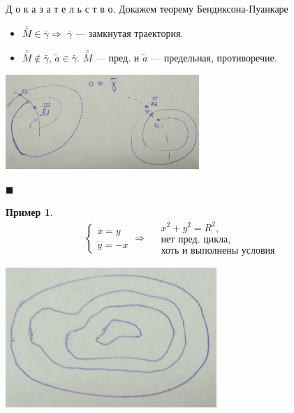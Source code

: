 \documentclass[oneside, final, 12pt]{article}
\theoremstyle{def}
\newtheorem{example}{Пример}[section]
\theoremstyle{th}
\theoremstyle{rem}
\renewenvironment{proof}{\par Д о к а з а т е л ь с т в о.}{\hfill$\blacksquare$}
\numberwithin{figure}{section}
\numberwithin{equation}{section}
\begin{document}
\begin{proof}{ Докажем теорему Бендиксона-Пуанкаре}
\begin{itemize}
\begin{itemize}
								\item $\bar{\bar{M}}\in \bar{\gamma} \Rightarrow$ $\bar{\gamma}$ --- замкнутая траектория.
								\item  $\bar{\bar{M}} \notin \bar{\gamma}$, $\tilde{a}\in \bar{\gamma}$. 
								$\bar{\bar{M}}$ --- пред. и $\tilde{a}$ --- предельная, противоречие.						
						\end{itemize}
						\begin{center} \includegraphics[width=0.55\textwidth]{pict/pict_11.png} \vspace{5mm}\end{center} 
		\end{itemize}
	
	\end{proof}

	\begin{minipage}{0.4\textwidth}
		
		\begin{example}
		$$
			\begin{cases}
				\dot{x} = y \\
				\dot{y} =-x
			\end{cases} \Rightarrow  \quad  \begin{gathered} x^2+y^2 = R^2, \\ \text{нет пред. цикла,}\\ \text{хоть
									 и выполнены условия} \end{gathered} 
		$$
		\end{example}
	\end{minipage} 
		\hfill
	\begin{minipage}{0.4\textwidth}	
		\begin{center} \includegraphics[width=0.6\textwidth]{pict/pict_7.png} \vspace{5mm}\end{center} 
	\end{minipage} 	
	
\end{document}
